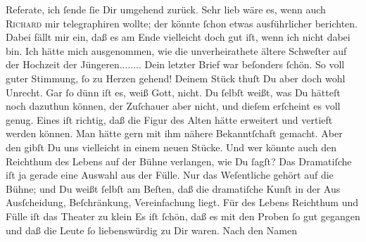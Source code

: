 \begin{ledgroupsized}[t]{13cm}
               Referate, ich ſende {\pb}ſie Dir umgehend zurück. Sehr
               lieb wäre es, wenn auch \textsc{Richard} mir telegraphiren wollte; der könnte ſchon etwas ausführlicher berichten.\pend
           \pstart
           Dabei fällt mir ein, daß es am Ende vielleicht doch gut iſt, wenn ich nicht dabei
               bin. Ich hätte mich ausgenommen, wie die unverheirathete ältere Schweſter auf der
               Hochzeit der Jüngeren........\pend
           \pstart
           Dein letzter Brief war beſonders ſchön. So voll guter Stimmung, ſo zu Herzen gehend!
               Deinem Stück thuſt Du aber
               doch wohl Unrecht. Gar ſo {\pb} dünn iſt es, weiß Gott, nicht. Du ſelbſt weißt, was Du hätteſt  noch dazuthun können, der Zuſchauer aber nicht,
               und dieſem erſcheint es voll genug. Eines iſt  richtig, daß die Figur des Alten hätte erweitert und vertieft werden können. Man hätte gern mit ihm
               nähere Bekanntſchaft gemacht. Aber den gibſt Du uns vielleicht in einem neuen Stücke.
               Und wer könnte auch den Reichthum des Lebens auf der Bühne verlangen, wie Du ſagſt?
                  \strikeout{\textcolor{gray}{×}} Das {\pb}Dramatiſche iſt ja gerade eine Auswahl
               aus der Fülle. Nur das Weſentliche gehört  auf die
               Bühne; und Du weißt ſelbſt am Beſten, daß die dramatiſche Kunſt in der Aus\strikeout{\textcolor{gray}{×}} Ausſcheidung, Beſchränkung, Vereinfachung liegt. Für des Lebens Reichthum und
               Fülle  iſt das Theater zu klein{\dotssix}\pend
           \pstart
           Es iſt ſchön, daß es mit den Proben ſo gut gegangen und daß die Leute ſo
               liebenswürdig zu Dir waren.  Nach den Namen

\end{ledgroupsized}
